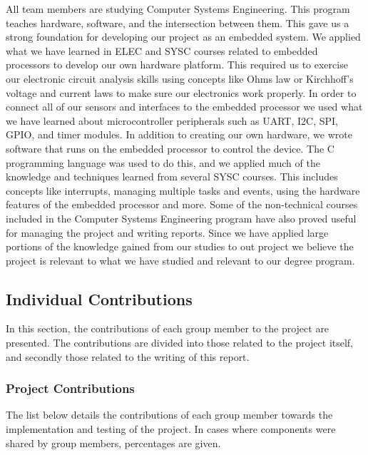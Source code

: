 All team members are studying Computer Systems Engineering.  This program
teaches hardware, software, and the intersection between them.  This gave us a
strong foundation for developing our project as an embedded system.  We
applied what we have learned in ELEC and SYSC courses related to embedded
processors to develop our own hardware platform.  This required us to
exercise our electronic circuit analysis skills using concepts like Ohms law or
Kirchhoff’s voltage and current laws to make sure our electronics work
properly.  In order to connect all of our sensors and interfaces to the
embedded processor we used what we have learned about microcontroller
peripherals such as UART, I2C, SPI, GPIO, and timer modules.  In addition to 
creating our own hardware, we wrote software that runs on the embedded processor
to control the device.  The C programming language was used to do this, and we 
applied much of the knowledge and techniques learned from several SYSC courses.  
This includes concepts like interrupts, managing multiple tasks and events, 
using the hardware features of the embedded processor and more.  Some of the
non-technical courses included in the Computer Systems Engineering program have 
also proved useful for managing the project and writing reports. 
Since we 
have applied large portions of the knowledge gained from our studies to
out project we believe the project is relevant to what we have studied and 
relevant to our degree program.

\subsection{Individual Contributions}
In this section, the contributions of each group member to the project are
presented. The contributions are divided into those related to the project 
itself, and secondly those related to the writing of this report.

\subsubsection{Project Contributions}
The list below details the contributions of each group member towards the
implementation and testing of the project. In cases where components were 
shared by group members, percentages are given.

